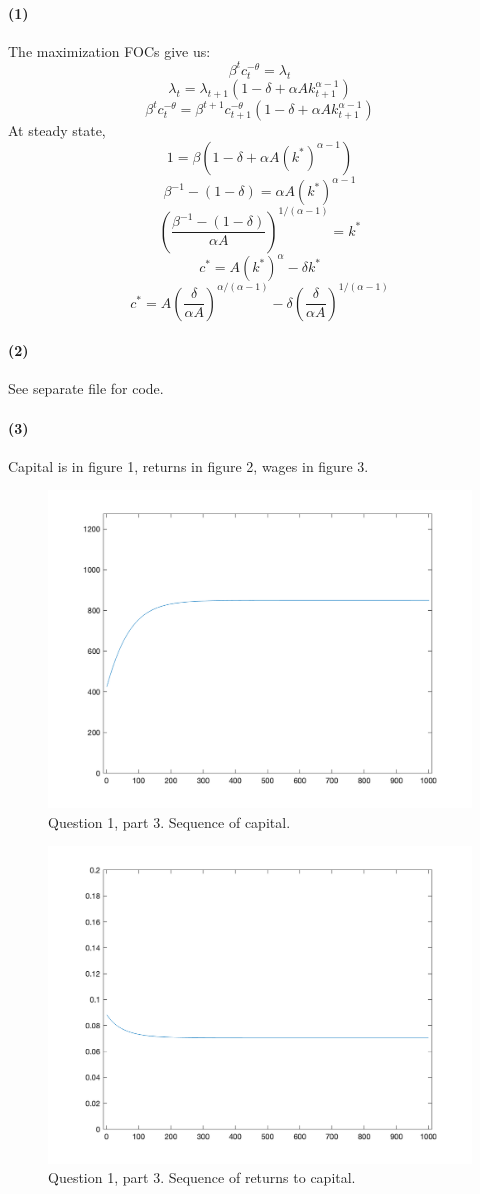 \documentclass[10pt,letter]{article}
\newcommand{\problempart}[1]{\paragraph{#1}}
\begin{document}
\problempart{(1)}
The maximization FOCs give us:
 \[ \beta^t c_t^{-\theta} = \lambda_t  \]
 \[ \lambda_t = \lambda_{t+1}(1-\delta + \alpha A k_{t+1}^{\alpha-1})\]
 \[ \beta^t c_t^{-\theta} = \beta^{t+1} c^{-\theta}_{t+1}(1-\delta + \alpha A k_{t+1}^{\alpha-1})\]
 At steady state,
 \[1 = \beta(1-\delta + \alpha A (k^*)^{\alpha-1}) \]
 \[ \beta^{-1} - (1-\delta) = \alpha A (k^*)^{\alpha-1} \]
 \[ \left(\frac{\beta^{-1} - (1-\delta)}{\alpha A}\right)^{1/(\alpha-1)} = k^*\]
 \[ c^* = A(k^*)^\alpha - \delta k^* \]
 \[ c^* = A\left(\frac{\delta}{\alpha A}\right)^{\alpha/(\alpha-1)} - \delta \left(\frac{\delta}{\alpha A}\right)^{1/(\alpha-1)} \]
\problempart{(2)}
See separate file for code.
\problempart{(3)}
Capital is in figure 1, returns in figure 2, wages in figure 3.
\begin{figure}
\centering
\includegraphics[scale=0.8]{ps1q1fig1}
\caption{Question 1, part 3. Sequence of capital.}
\end{figure}
\begin{figure}
\centering
\includegraphics[scale=0.8]{ps1q1fig2}
\caption{Question 1, part 3. Sequence of returns to capital.}
\end{figure}
\end{document}
